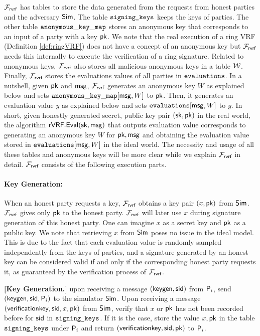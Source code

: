 $ \mathcal{F}_{\textsf{rvrf}} $ has tables to store the data generated from the requests from honest parties and the adversary $ \mathsf{Sim} $. The table $ \texttt{signing\_keys} $  keeps the keys of parties. The other table  $ \mathtt{anonymous\_key\_map} $ stores an anonymous key that corresponds to an input  of a party with a key $ \mathsf{pk} $. We note that the real execution of a ring VRF (Definition \ref{def:ringVRF}) does not have a concept of an anonymous key but $ \mathcal{F}_{\textsf{rvrf}} $ needs this internally to execute the verification of a ring signature. Related to anonymous keys, $ \mathcal{F}_{\textsf{rvrf}} $ also stores  all  malicious anonymous keys in a table $ \mathcal{W} $. Finally, $ \mathcal{F}_{\textsf{rvrf}} $ stores the evaluations values of all parties in $ \texttt{evaluations} $. In a nutshell,  given $ \mathsf{pk} $
and $ \mathsf{msg} $, $ \mathcal{F}_{\textsf{rvrf}} $  generates an anonymous key $ W $ as explained below and  sets $ \mathtt{anonymous\_key\_map}[\mathsf{msg},W]  $ to $ \mathsf{pk} $. Then, it generates an evaluation value $ y $ as explained below and sets $ \texttt{evaluations}[\mathsf{msg},W]  $ to $ y $. In short, given honestly generated secret, public key pair $ (\mathsf{sk},\mathsf{pk}) $ in the real world, the algorithm
$ {\mathsf{rVRF}}.{\mathsf{Eval}}(\mathsf{sk},\mathsf{msg}) $  that outputs evaluation value corresponds to generating an anonymous key $ W $ for $ \mathsf{pk}, \mathsf{msg} $ and obtaining the evaluation value stored in $ \texttt{evaluations}[\mathsf{msg},W] $ in the ideal world. The necessity and usage of all these tables and anonymous keys will be more clear while we explain $ \mathcal{F}_{\textsf{rvrf}} $ in detail. $ \mathcal{F}_{\textsf{rvrf}} $ consists of the following execution parts.



\paragraph{Key Generation:}  When an honest party requests  a key, $ \mathcal{F}_{\textsf{rvrf}} $ obtains a key pair $ (x, \mathsf{pk}) $ from $ \mathsf{Sim} $. $ \mathcal{F}_{\textsf{rvrf}} $ gives only $ \mathsf{pk} $ to the honest party. $ \mathcal{F}_{\textsf{rvrf}} $ will later use $ x $ during signature generation of this honest party. One can imagine $ x $ as a secret key and $ \mathsf{pk} $ as a public key. We note that retrieving $ x $ from $ \mathsf{Sim} $ poses no issue in the ideal model. This is due to the fact that each evaluation value is randomly sampled independently from the keys of parties, and a signature generated by an honest key can be considered valid if and only if the corresponding honest party requests it, as guaranteed by the verification process of $\mathcal{F}_{\textsf{rvrf}}$.



\begin{tcolorbox}[left=2pt,right=2pt]
	\eprint{}{\scriptsize}
	\textbf{[Key Generation.]} upon receiving a message $(\mathsf{keygen}, \textsf{sid})$ from  $\mathsf{P}_i$, send $(\mathsf{keygen}, \textsf{sid}, \mathsf{P}_i)$ to the simulator $\mathsf{Sim}$.
	Upon receiving a message $(\mathsf{verificationkey}, \textsf{sid}, x,\mathsf{pk})$ from $\mathsf{Sim}$, verify that $x $ or $\mathsf{pk}$ has not been recorded before for $ \textsf{sid} $ in $ \texttt{signing\_keys} $. If it is the case, store  the value $x,\mathsf{pk}$ in the table $\texttt{signing\_keys}$ under $\mathsf{P}_i$ and return $(\mathsf{verificationkey}, \textsf{sid}, \mathsf{pk})$ to $ \mathsf{P}_i$.
\end{tcolorbox}


